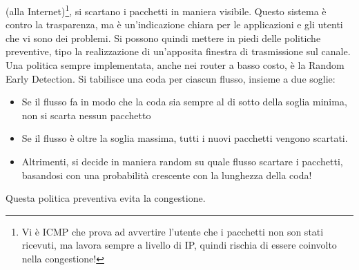 (alla Internet)\footnote{Vi è ICMP che prova ad avvertire l’utente che i pacchetti non son stati ricevuti, ma lavora
sempre a livello di IP, quindi rischia di essere coinvolto nella congestione!}, si scartano i pacchetti in maniera
visibile. Questo sistema è contro la trasparenza, ma è un'indicazione chiara per le applicazioni e gli utenti che vi
sono dei problemi. Si possono quindi mettere in piedi delle politiche preventive, tipo la realizzazione di un'apposita
finestra di trasmissione sul canale.
Una politica sempre implementata, anche nei router a basso costo, è la Random Early Detection. Si tabilisce una coda
per ciascun flusso, insieme a due soglie:
\begin{itemize}
 \item Se il flusso fa in modo che la coda sia sempre al di sotto della soglia minima, non si scarta nessun pacchetto
 \item Se il flusso è oltre la soglia massima, tutti i nuovi pacchetti vengono scartati.
 \item Altrimenti, si decide in maniera random su quale flusso scartare i pacchetti, basandosi con una probabilità
 crescente con la lunghezza della coda!
\end{itemize}
Questa politica preventiva evita la congestione.
